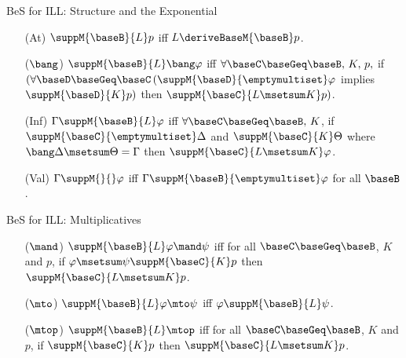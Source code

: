 \documentclass{beamer}
\begin{document}
\begin{frame}{BeS for ILL: Structure and the Exponential}
	\begin{itemize}
	\item[(At)] $\suppM{\baseB}{L}p$ iff $L\deriveBaseM{\baseB}p$.\vspace{0.3cm}
	\item[($\bang$)] $\suppM{\baseB}{L}\bang\varphi$ iff \newline $\forall\baseC\baseGeq\baseB,\, K,\,p,$ if $(\forall\baseD\baseGeq\baseC\, (\suppM{\baseD}{\emptymultiset}\varphi$ implies $\suppM{\baseD}{K}p)$ then $\suppM{\baseC}{L\msetsum K}p)$.\vspace{0.3cm}
	\item[(Inf)] $\Gamma\suppM{\baseB}{L}\varphi$ iff \newline $\forall\baseC\baseGeq\baseB,\, K$, if $\suppM{\baseC}{\emptymultiset}\Delta$ and $\suppM{\baseC}{K}\Theta$ where $\bang\Delta\msetsum\Theta = \Gamma$ then $\suppM{\baseC}{L\msetsum K}\varphi$.\vspace{0.3cm}
	\item[(Val)] $\Gamma\suppM{}{}\varphi$ iff $\Gamma\suppM{\baseB}{\emptymultiset}\varphi$ for all $\baseB$.
	\end{itemize}
\end{frame}
\begin{frame}{BeS for ILL: Multiplicatives}
	\begin{itemize}
	\item[($\mand$)] $\suppM{\baseB}{L}\varphi\mand\psi$ iff for all $\baseC\baseGeq\baseB$, $K$ and $p$, if $\varphi\msetsum\psi\suppM{\baseC}{K}p$ then $\suppM{\baseC}{L\msetsum K}p$.\vspace{0.3cm}
	\item[($\mto$)] $\suppM{\baseB}{L}\varphi\mto\psi$ iff $\varphi\suppM{\baseB}{L}\psi$.\vspace{0.3cm}
	\item[($\mtop$)] $\suppM{\baseB}{L}\mtop$ iff for all $\baseC\baseGeq\baseB$, $K$ and $p$, if $\suppM{\baseC}{K}p$ then $\suppM{\baseC}{L\msetsum K}p$.\vspace{0.3cm}
	\end{itemize}
\end{frame}
\end{document}

